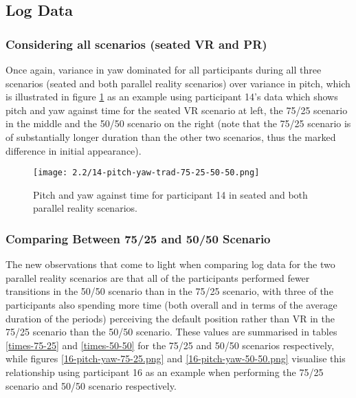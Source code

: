 
\subsection{Log Data}

\subsubsection{Considering all scenarios (seated VR and PR)}

Once again, variance in yaw dominated for all participants during all three scenarios (seated and both parallel reality scenarios) over variance in pitch, which is illustrated in figure \ref{14-pitch-yaw-trad-75-25-50-50.png} as an example using participant 14's data which shows pitch and yaw against time for the seated VR scenario at left, the 75/25 scenario in the middle and the 50/50 scenario on the right (note that the 75/25 scenario is of substantially longer duration than the other two scenarios, thus the marked difference in initial appearance).

\begin{figure}[h]
	\begin{center}
	\texttt{[image: 2.2/14-pitch-yaw-trad-75-25-50-50.png]}
	\caption{Pitch and yaw against time for participant 14 in seated and both parallel reality scenarios.}
	\label{14-pitch-yaw-trad-75-25-50-50.png}
	\end{center}
\end{figure}


\subsubsection{Comparing Between 75/25 and 50/50 Scenario}

The new observations that come to light when comparing log data for the two parallel reality scenarios are that all of the participants performed fewer transitions in the 50/50 scenario than in the 75/25 scenario, with three of the participants also spending more time (both overall and in terms of the average duration of the periods) perceiving the default position rather than VR in the 75/25 scenario than the 50/50 scenario. These values are summarised in tables \ref{times-75-25} and \ref{times-50-50} for the 75/25 and 50/50 scenarios respectively, while figures \ref{16-pitch-yaw-75-25.png} and \ref{16-pitch-yaw-50-50.png} visualise this relationship using participant 16 as an example when performing the 75/25 scenario and 50/50 scenario respectively.

